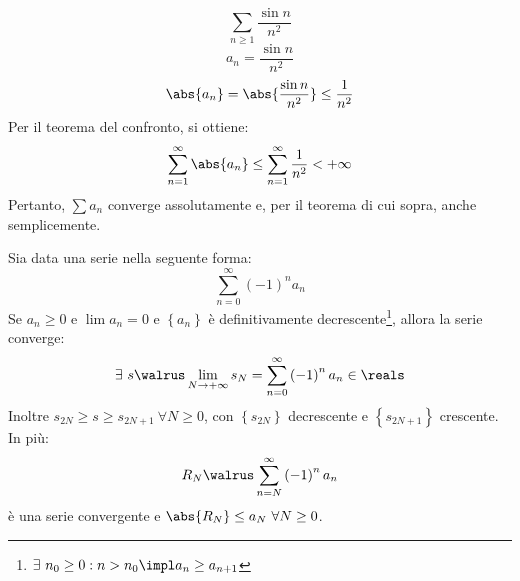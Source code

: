 \begin{example}
  $$\sum_{n\ge1}\frac{\sin n}{n^2}$$
  $$a_n=\frac{\sin n}{n^2}$$
  $$\abs{a_n}=\abs{\frac{\sin n}{n^2}}\le\frac{1}{n^2}$$
  Per il teorema del confronto, si ottiene:
  $$\sum_{n=1}^\infty\abs{a_n}\le\sum_{n=1}^\infty\frac{1}{n^2}<+\infty$$
  Pertanto, $\sum a_n$ converge assolutamente e, per il teorema di cui sopra, anche semplicemente.
\end{example}

\begin{theorem}
  Sia data una serie nella seguente forma:
  $$\sum_{n=0}^\infty\left( -1 \right)^na_n$$
  Se $a_n\ge0$ e $\lim a_n=0$ e $\left\{ a_n \right\}$ è definitivamente decrescente\footnote{$\exists\ n_0\ge0:n>n_0\impl a_n\ge a_{n+1}$}, allora la serie converge:
  $$\exists\ s\walrus \lim_{N\to+\infty}s_N=\sum_{n=0}^\infty\left( -1 \right)^na_n\in\reals$$
  Inoltre $s_{2N}\ge s\ge s_{2N+1}\ \forall N\ge0$, con $\left\{ s_{2N} \right\}$ decrescente e $\left\{ s_{2N+1} \right\}$ crescente.
  In più:
  $$R_N\walrus \sum_{n=N}^\infty\left( -1 \right)^na_n$$
  è una serie convergente e $\abs{R_N}\le a_N\ \forall N\ge0$.
\end{theorem}

